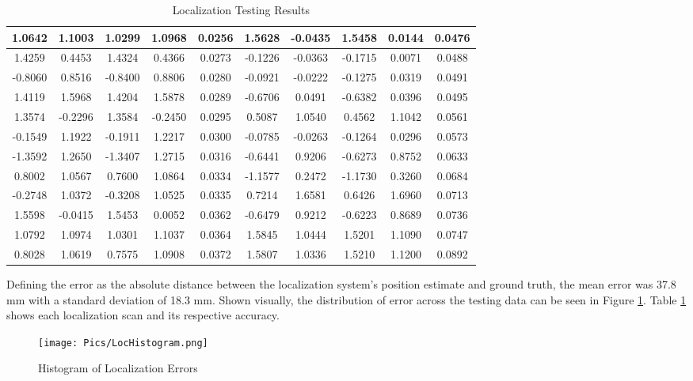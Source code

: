 \begin{center}
\begin{table}[ht!]
{\begin{tabular}{|c|c|c|c|c||c|c|c|c|c|}
1.0642 & 1.1003 & 1.0299 & 1.0968 & 0.0256 & 1.5628 & -0.0435 & 1.5458 & 0.0144 & 0.0476 \\ \hline
1.4259 & 0.4453 & 1.4324 & 0.4366 & 0.0273 & -0.1226 & -0.0363 & -0.1715 & 0.0071 & 0.0488 \\ \hline
-0.8060 & 0.8516 & -0.8400 & 0.8806 & 0.0280 & -0.0921 & -0.0222 & -0.1275 & 0.0319 & 0.0491 \\ \hline
1.4119 & 1.5968 & 1.4204 & 1.5878 & 0.0289 & -0.6706 & 0.0491 & -0.6382 & 0.0396 & 0.0495 \\ \hline
1.3574 & -0.2296 & 1.3584 & -0.2450 & 0.0295 & 0.5087 & 1.0540 & 0.4562 & 1.1042 & 0.0561 \\ \hline
-0.1549 & 1.1922 & -0.1911 & 1.2217 & 0.0300 & -0.0785 & -0.0263 & -0.1264 & 0.0296 & 0.0573 \\ \hline
-1.3592 & 1.2650 & -1.3407 & 1.2715 & 0.0316 & -0.6441 & 0.9206 & -0.6273 & 0.8752 & 0.0633 \\ \hline
0.8002 & 1.0567 & 0.7600 & 1.0864 & 0.0334 & -1.1577 & 0.2472 & -1.1730 & 0.3260 & 0.0684 \\ \hline
-0.2748 & 1.0372 & -0.3208 & 1.0525 & 0.0335 & 0.7214 & 1.6581 & 0.6426 & 1.6960 & 0.0713 \\ \hline
1.5598 & -0.0415 & 1.5453 & 0.0052 & 0.0362 & -0.6479 & 0.9212 & -0.6223 & 0.8689 & 0.0736 \\ \hline
1.0792 & 1.0974 & 1.0301 & 1.1037 & 0.0364 & 1.5845 & 1.0444 & 1.5201 & 1.1090 & 0.0747 \\ \hline
0.8028 & 1.0619 & 0.7575 & 1.0908 & 0.0372 & 1.5807 & 1.0336 & 1.5210 & 1.1200 & 0.0892 \\
\hline
\end{tabular}
}
\caption{Localization Testing Results}
\label{tab:optiresults}
\hfill{}
\end{table}
\end{center}

Defining the error as the absolute distance between the localization system's position estimate and ground truth, the mean error was 37.8 mm with a standard deviation of 18.3 mm. Shown visually, the distribution of error across the testing data can be seen in Figure \ref{fig:locerrordist}. Table \ref{tab:optiresults} shows each localization scan and its respective accuracy. \\

\begin{figure}
    \centering
    \texttt{[image: Pics/LocHistogram.png]}
    \caption{Histogram of Localization Errors}
    \label{fig:locerrordist}
\end{figure}

